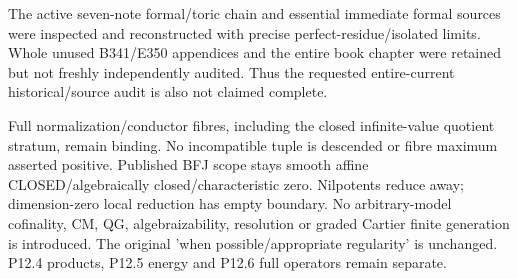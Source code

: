 \documentclass[11pt]{article}
\begin{document}
The active seven-note formal/toric chain and essential immediate formal sources were inspected and reconstructed with precise perfect-residue/isolated limits. Whole unused B341/E350 appendices and the entire book chapter were retained but not freshly independently audited. Thus the requested entire-current historical/source audit is also not claimed complete.

Full normalization/conductor fibres, including the closed infinite-value quotient stratum, remain binding. No incompatible tuple is descended or fibre maximum asserted positive. Published BFJ scope stays smooth affine CLOSED/algebraically closed/characteristic zero. Nilpotents reduce away; dimension-zero local reduction has empty boundary. No arbitrary-model cofinality, CM, QG, algebraizability, resolution or graded Cartier finite generation is introduced. The original 'when possible/appropriate regularity' is unchanged. P12.4 products, P12.5 energy and P12.6 full operators remain separate.

\appendix
\end{document}
